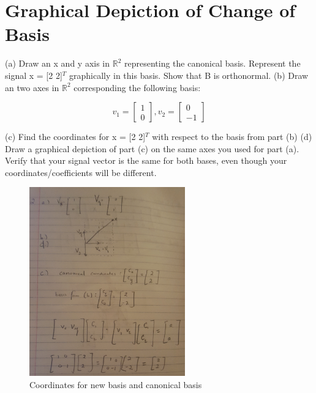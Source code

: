 \documentclass[11pt]{article}
\begin{document}
\newpage


\section{Graphical Depiction of Change of Basis}
(a) Draw an x and y axis in $ \mathbb{R}^2 $ representing the canonical basis. Represent the signal x = [2 2]$^{T}$ graphically in this basis.
Show that B is orthonormal.\newline
(b) Draw an two axes in $ \mathbb{R}^2 $ corresponding the following basis:


\begin{center}
\[
v_1 = 
\begin{bmatrix}
   1 \\
   0          
\end{bmatrix},
v_2= 
\begin{bmatrix}
   0 \\
   -1          
\end{bmatrix}
\]
\end{center}

(c) Find the coordinates for x = [2 2]$^T$ with respect to the basis from part (b)\newline
(d) Draw a graphical depiction of part (c) on the same axes you used for part (a). Verify that your signal vector is the same for both bases, even though your coordinates/coefficients will be different.

\vspace{4mm}


\begin{figure}[h]
\centering
\includegraphics[width=0.6\textwidth]{graphical2d.jpg}
\caption {Coordinates for new basis and canonical basis}
\end{figure}
\end{document}
